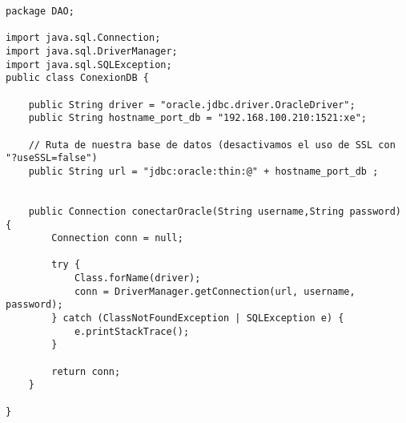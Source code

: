 

\begin{lstlisting}[caption=ConexionDB.java (App Escritorio)]
package DAO;

import java.sql.Connection;
import java.sql.DriverManager;
import java.sql.SQLException;
public class ConexionDB {
	
    public String driver = "oracle.jdbc.driver.OracleDriver";
    public String hostname_port_db = "192.168.100.210:1521:xe";

    // Ruta de nuestra base de datos (desactivamos el uso de SSL con "?useSSL=false")
    public String url = "jdbc:oracle:thin:@" + hostname_port_db ;


    public Connection conectarOracle(String username,String password) {
        Connection conn = null;

        try {
            Class.forName(driver);
            conn = DriverManager.getConnection(url, username, password);
        } catch (ClassNotFoundException | SQLException e) {
            e.printStackTrace();
        }

        return conn;
    }

}
\end{lstlisting}
\clearpage
